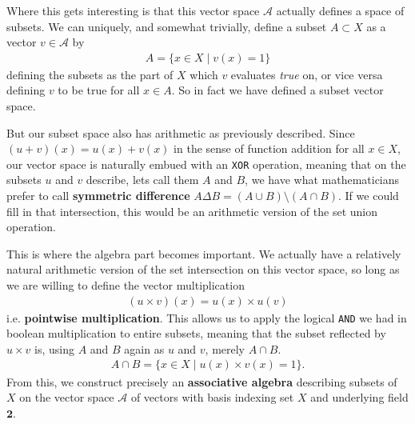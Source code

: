 \documentclass[11pt]{article}
\begin{document}
Where this gets interesting is that this vector space $\mathcal A$ actually defines a space of subsets. We can uniquely, and somewhat trivially, define a subset $A \subset X$ as a vector $v \in \mathcal A$ by \begin{gather*}
A = \{ x \in X \mid v(x) = 1 \} 
\end{gather*}
defining the subsets as the part of $X$ which $v$ evaluates \emph{true} on, or vice versa defining $v$ to be true for all $x \in A$. So in fact we have defined a subset vector space.

But our subset space also has arithmetic as previously described. Since $(u+v)(x) = u(x) + v(x)$ in the sense of function addition for all $x\in X$, our vector space is naturally embued with an \texttt{XOR} operation, meaning that on the subsets $u$ and $v$ describe, lets call them $A$ and $B$, we have what mathematicians prefer to call \textbf{symmetric difference} $A \Delta B = (A \cup B) \setminus (A \cap B)$. If we could fill in that intersection, this would be an arithmetic version of the set union operation.

This is where the algebra part becomes important. We actually have a relatively natural arithmetic version of the set intersection on this vector space, so long as we are willing to define the vector multiplication \begin{gather*}
(u \times v)(x) = u(x) \times u(v)
\end{gather*}
i.e. \textbf{pointwise multiplication}. This allows us to apply the logical \texttt{AND} we had in boolean multiplication to entire subsets, meaning that the subset reflected by $u \times v$ is, using $A$ and $B$ again as $u$ and $v$, merely $A \cap B$. \begin{gather*}
A \cap B = \{x \in X \mid u(x) \times v(x) = 1\}.
\end{gather*}
From this, we construct precisely an \textbf{associative algebra} describing subsets of $X$ on the vector space $\mathcal A$ of vectors with basis indexing set $X$ and underlying field $\mathbf{2}$.
\end{document}
